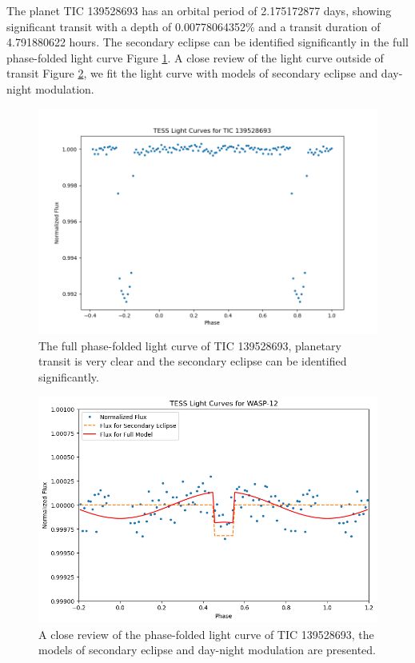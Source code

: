 \documentclass{article}
\begin{document}
The planet TIC 139528693 has an orbital period of 2.175172877 days, showing significant transit with a depth of 0.00778064352\% and a transit duration of 4.791880622 hours. The secondary eclipse can be identified significantly in the full phase-folded light curve Figure \ref{fig:139528693_folded}. A close review of the light curve outside of transit Figure \ref{fig:139528693}, we fit the light curve with models of secondary eclipse and day-night modulation.\begin{figure}[H]\centering\includegraphics[width=0.7\linewidth]{image/139528693_folded.png}\captionsetup{font=small} \caption{The full phase-folded light curve of TIC 139528693, planetary transit is very clear and the secondary eclipse can be identified significantly.}\label{fig:139528693_folded}\end{figure}\begin{figure}[H]\centering\includegraphics[width=0.65\linewidth]{image/139528693.png}\captionsetup{font=small} \caption{A close review of the phase-folded light curve of TIC 139528693, the models of secondary eclipse and day-night modulation are presented.}\label{fig:139528693}\end{figure}
\newpage
\end{document}
